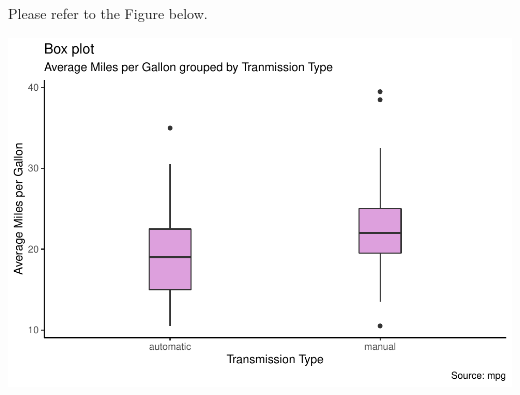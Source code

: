 \documentclass[
]{article}
\begin{document}
Please refer to the Figure below.

\includegraphics{TEST2_files/figure-latex/plot-1.pdf}
\end{document}
